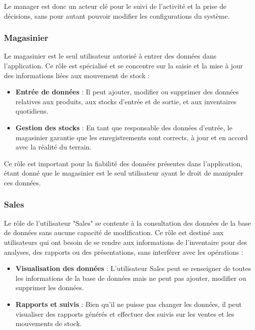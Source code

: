 \documentclass[a4paper, oneside, 12pt, final]{extreport}
\begin{document}
Le manager est donc un acteur clé pour le suivi de l'activité et la prise de décisions, sans pour autant pouvoir modifier les configurations du système.

\subsubsection{Magasinier}

Le magasinier est le seul utilisateur autorisé à entrer des données dans l'application. Ce rôle est spécialisé et se concentre sur la saisie et la mise à jour des informations liées aux mouvement de stock :

\begin{itemize}
    \item \textbf{Entrée de données} : Il peut ajouter, modifier ou supprimer des données relatives aux produits, aux stocks d’entrée et de sortie, et aux inventaires quotidiens.
    \item \textbf{Gestion des stocks} : En tant que responsable des données d'entrée, le magasinier garantie que les enregistrements sont corrects, à jour et en accord avec la réalité du terrain.
\end{itemize}

Ce rôle est important pour la fiabilité des données présentes dans l'application, étant donné que le magasinier est le seul utilisateur ayant le droit de manipuler ces données.

\subsubsection{Sales}

Le rôle de l'utilisateur "Sales" se contente à la consultation des données de la base de données sans aucune capacité de modification. Ce rôle est destiné aux utilisateurs qui ont besoin de se rendre aux informations de l'inventaire pour des analyses, des rapports ou des présentations, sans interférer avec les opérations :

\begin{itemize}
    \item \textbf{Visualisation des données} : L'utilisateur Sales peut se renseigner de toutes les informations de la base de données mais ne peut pas ajouter, modifier ou supprimer les données.
    \item \textbf{Rapports et suivis} : Bien qu'il ne puisse pas changer les données, il peut visualiser des rapports générés et effectuer des suivis sur les ventes et les mouvements de stock.
\end{itemize}
\end{document}
